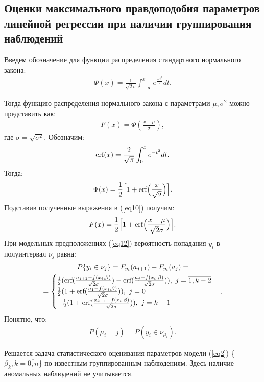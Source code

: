 \subsection{Оценки максимального правдоподобия параметров линейной регрессии при наличии группирования наблюдений}
Введем обозначение для функции распределения стандартного нормального закона:
\begin{eqnarray}
    \Phi(x)=\frac{1}{\sqrt{2}\sigma}\int_{-\infty}^{x}e^{\frac{-t^2}{2}}dt.
\end{eqnarray}

Тогда функцию распределения нормального закона с параметрами $\mu,\sigma^2$ можно представить как:
\begin{eqnarray}
    \label{eq10}F(x)=\Phi(\frac{x-\mu}{\sigma}),
\end{eqnarray}
где $\sigma = \sqrt{\sigma^2}$. \hfill\break
Обозначим:
\begin{eqnarray}
    \textup{erf}(x)=\frac{2}{\sqrt{\pi}}\int_0^{x}e^{-t^2}dt.
\end{eqnarray}
Тогда:
\begin{eqnarray}
    \Phi(x)= \frac{1}{2} \Big[1+\textup{erf}\Big(\frac{x}{\sqrt{2}} \Big) \Big].
\end{eqnarray}
Подставив полученные выражения в (\ref{eq10}) получим:
\begin{eqnarray}
    F(x)= \frac{1}{2} \Big[1+\textup{erf}\Big(\frac{x-\mu}{\sqrt{2}\sigma} \Big) \Big].
\end{eqnarray}
При модельных предположениях (\ref{eq12}) вероятность попадания $y_i$ в полуинтервал $\nu_j$ равна:
\begin{multline}
    P\{y_i\in\nu_j\}= F_{y_i}(a_{j+1})-F_{y_i}(a_{j})=\\
    =\begin{cases}
        \frac{1}{2}(\textup{erf}(\frac{a_{j+1}-f(x_i,\beta)}{\sqrt{2}\sigma})-\textup{erf}(\frac{a_{j}-f(x_i,\beta)}{\sqrt{2}\sigma})),~j=\overline{1,k-2}\\
        \frac{1}{2}(1+\textup{erf}(\frac{a_{1}-f(x_i,\beta)}{\sqrt{2}\sigma})),~j=0\\
        -\frac{1}{2}(1+\textup{erf}(\frac{a_{k-1}-f(x_i,\beta)}{\sqrt{2}\sigma})),~j=k-1
    \end{cases}.
\end{multline}
Понятно, что:
\begin{eqnarray}
    P(\mu_i=j)=P(y_i\in \nu_{\mu_i}).
\end{eqnarray}

Решается задача статистического оценивания параметров модели (\ref{eq2}) \{$\beta_k, k=\overline{0,n}$\} по известным группированным наблюдениям. Здесь наличие аномальных наблюдений не учитывается.

